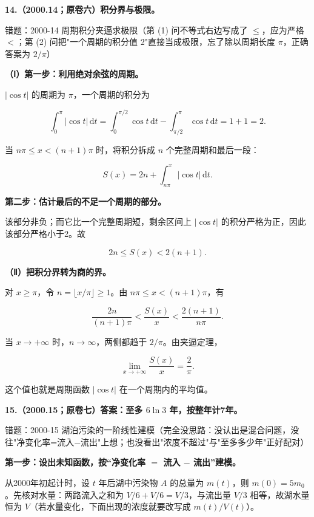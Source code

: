 \documentclass[UTF8,11pt,fontset=windows]{ctexart}
\begin{document}
\textbf{14.（2000.14；原卷六）积分界与极限。}

\begingroup\color{gray}错题：2000-14 周期积分夹逼求极限（第 (1) 问不等式右边写成了 $\leqslant$，应为严格 $<$；第 (2) 问把"一个周期的积分值 2"直接当成极限，忘了除以周期长度 $\pi$，正确答案为 $2/\pi$）\par\endgroup

\textbf{（Ⅰ）第一步：利用绝对余弦的周期。}

$|\cos t|$ 的周期为 $\pi$，一个周期的积分为

$$
\int_0^\pi|\cos t|\,\mathrm dt
=\int_0^{\pi/2}\cos t\,\mathrm dt
 -\int_{\pi/2}^{\pi}\cos t\,\mathrm dt=1+1=2.
$$

当 $n\pi\le x<(n+1)\pi$ 时，将积分拆成 $n$ 个完整周期和最后一段：

$$
S(x)=2n+\int_{n\pi}^{x}|\cos t|\,\mathrm dt.
$$

\textbf{第二步：估计最后的不足一个周期的部分。}

该部分非负；而它比一个完整周期短，剩余区间上 $|\cos t|$ 的积分严格为正，因此该部分严格小于2。故

$$
2n\le S(x)<2(n+1).
$$

\textbf{（Ⅱ）把积分界转为商的界。}

对 $x\ge\pi$，令 $n=\lfloor x/\pi\rfloor\ge1$。由 $n\pi\le x<(n+1)\pi$，有

$$
\frac{2n}{(n+1)\pi}<\frac{S(x)}x<\frac{2(n+1)}{n\pi}.
$$

当 $x\to+\infty$ 时，$n\to\infty$，两侧都趋于 $2/\pi$。由夹逼定理，

$$
\lim_{x\to+\infty}\frac{S(x)}x=\frac2\pi.
$$

这个值也就是周期函数 $|\cos t|$ 在一个周期内的平均值。

\clearpage

\textbf{15.（2000.15；原卷七）答案：至多 $6\ln3$ 年，按整年计7年。}

\begingroup\color{gray}错题：2000-15 湖泊污染的一阶线性建模（完全没思路：没认出是混合问题，没往"净变化率=流入−流出"上想；也没看出"浓度不超过"与"至多多少年"正好配对）\par\endgroup

\textbf{第一步：设出未知函数，按“净变化率 $=$ 流入 $-$ 流出”建模。}

从2000年初起计时，设 $t$ 年后湖中污染物 $A$ 的总量为 $m(t)$，则 $m(0)=5m_0$。先核对水量：两路流入之和为 $V/6+V/6=V/3$，与流出量 $V/3$ 相等，故湖水量恒为 $V$（若水量变化，下面出现的浓度就要改写成 $m(t)/V(t)$）。
\end{document}
